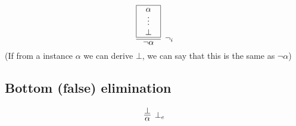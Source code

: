 \documentclass{article}
\newcommand{\rulename}[1]{#1}
\begin{document}
    \begin{equation*}
      \infer[\rulename{\neg_i}]
      {\neg \alpha}
      {
        \framebox{\parbox{.8cm}{\centerline{$\alpha$}\centerline{$\vdots$}\centerline{$\bot$}}}
      }
    \end{equation*}
    (If from a instance $\alpha$ we can derive $\bot$, we can say that this is the same as $\neg\alpha$)
    
\subsection{Bottom (false) elimination}
    \begin{equation*}
      \infer[\rulename{\bot_e}]
      {\alpha}
      {\bot}
    \end{equation*}
\end{document}
